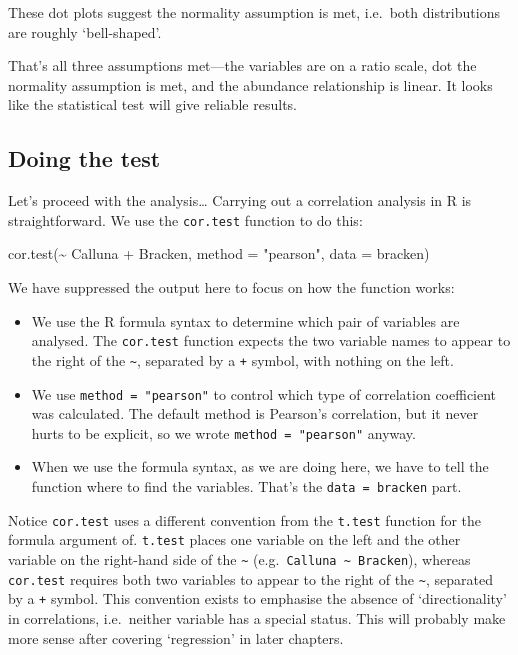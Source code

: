 \documentclass[
]{book}
\newenvironment{Shaded}{\begin{snugshade}}{\end{snugshade}}
\newcommand{\AttributeTok}[1]{\textcolor[rgb]{0.77,0.63,0.00}{#1}}
\newcommand{\FunctionTok}[1]{\textcolor[rgb]{0.00,0.00,0.00}{#1}}
\newcommand{\NormalTok}[1]{#1}
\newcommand{\SpecialCharTok}[1]{\textcolor[rgb]{0.00,0.00,0.00}{#1}}
\newcommand{\StringTok}[1]{\textcolor[rgb]{0.31,0.60,0.02}{#1}}
\begin{document}
These dot plots suggest the normality assumption is met, i.e.~both distributions are roughly `bell-shaped'.

That's all three assumptions met---the variables are on a ratio scale, dot the normality assumption is met, and the abundance relationship is linear. It looks like the statistical test will give reliable results.

\hypertarget{doing-the-test}{%
\subsection{Doing the test}\label{doing-the-test}}

Let's proceed with the analysis\ldots{} Carrying out a correlation analysis in R is straightforward. We use the \texttt{cor.test} function to do this:

\begin{Shaded}
\begin{Highlighting}[]
\FunctionTok{cor.test}\NormalTok{(}\SpecialCharTok{\textasciitilde{}}\NormalTok{ Calluna }\SpecialCharTok{+}\NormalTok{ Bracken, }\AttributeTok{method =} \StringTok{"pearson"}\NormalTok{, }\AttributeTok{data =}\NormalTok{ bracken)}
\end{Highlighting}
\end{Shaded}

We have suppressed the output here to focus on how the function works:

\begin{itemize}
\item
  We use the R formula syntax to determine which pair of variables are analysed. The \texttt{cor.test} function expects the two variable names to appear to the right of the \texttt{\textasciitilde{}}, separated by a \texttt{+} symbol, with nothing on the left.
\item
  We use \texttt{method\ =\ "pearson"} to control which type of correlation coefficient was calculated. The default method is Pearson's correlation, but it never hurts to be explicit, so we wrote \texttt{method\ =\ "pearson"} anyway.
\item
  When we use the formula syntax, as we are doing here, we have to tell the function where to find the variables. That's the \texttt{data\ =\ bracken} part.
\end{itemize}

Notice \texttt{cor.test} uses a different convention from the \texttt{t.test} function for the formula argument of. \texttt{t.test} places one variable on the left and the other variable on the right-hand side of the \texttt{\textasciitilde{}} (e.g.~\texttt{Calluna\ \textasciitilde{}\ Bracken}), whereas \texttt{cor.test} requires both two variables to appear to the right of the \texttt{\textasciitilde{}}, separated by a \texttt{+} symbol. This convention exists to emphasise the absence of `directionality' in correlations, i.e.~neither variable has a special status. This will probably make more sense after covering `regression' in later chapters.
\end{document}
